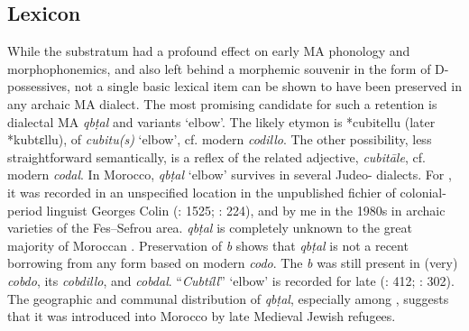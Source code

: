 \documentclass[output=paper]{langsci/langscibook}
\begin{document}
\subsection{Lexicon}

While the  substratum had a profound effect on early MA phonology and morphophonemics, and also left behind a morphemic souvenir in the form of D-possessives, not a single basic  lexical item can be shown to have been preserved in any archaic MA dialect. The most promising candidate for such a retention is dialectal MA \textit{qbṭal} and variants ‘elbow’. The likely etymon is  *cubitellu (later  *kubtɛllu),  of  \textit{cubitu(s)} ‘elbow’, cf. modern  \textit{codillo}. The other possibility, less straightforward semantically, is a reflex of the related adjective,  \textit{cubitāle}, cf. modern  \textit{codal}. In Morocco, \textit{qbṭal} ‘elbow’ survives in several Judeo- dialects. For , it was recorded in an unspecified location in the unpublished fichier of colonial-period linguist Georges Colin (\citealt{IraquiSinaceur1993}: 1525; \citealt{Prémare1998}: 224), and by me in the 1980s in archaic varieties of the Fes--Sefrou area. \textit{qbṭal} is completely unknown to the great majority of Moroccan . Preservation of \textit{b} shows that \textit{qbṭal} is not a recent borrowing from any form based on modern  \textit{codo}. The \textit{b} was still present in (very)   \textit{cobdo}, its  \textit{cobdillo}, and \textit{cobdal}. “\textit{Cubtíll}” ‘elbow’ is recorded for late   (\citealt{Corriente1997dictionary}: 412; \citealt{Dozy1967}: 302). The geographic and communal distribution of \textit{qbṭal}, especially among , suggests that it was introduced into Morocco by late Medieval Jewish refugees. 
\end{document}
